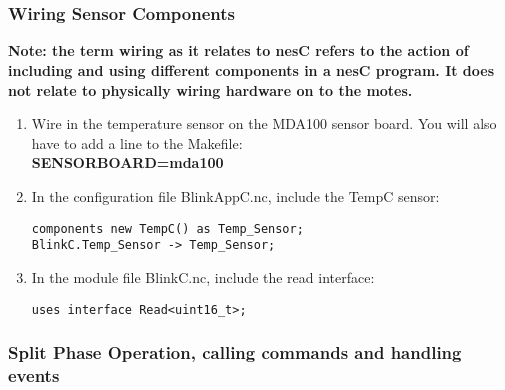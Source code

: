 \documentclass [a4] {article}
\begin{document}
\part{}
\label{part_2}

\section{Wiring Sensor Components}

{\bf Note: the term wiring as it relates to nesC refers to the action of including and using different components in a nesC program. It does not relate to physically wiring hardware on to the motes. }

\begin{enumerate}

\item Wire in the temperature sensor on the MDA100 sensor board. You will also have to add a line to the Makefile:\\

{\bf SENSORBOARD=mda100}

\item In the configuration file  BlinkAppC.nc, include the TempC sensor:

\begin{verbatim}
components new TempC() as Temp_Sensor;
BlinkC.Temp_Sensor -> Temp_Sensor;
\end{verbatim}

\item In the module file BlinkC.nc, include the read interface:
\begin{verbatim}
uses interface Read<uint16_t>;
\end{verbatim}
\end{enumerate}

\section{Split Phase Operation, calling commands and handling events}
\end{document}
